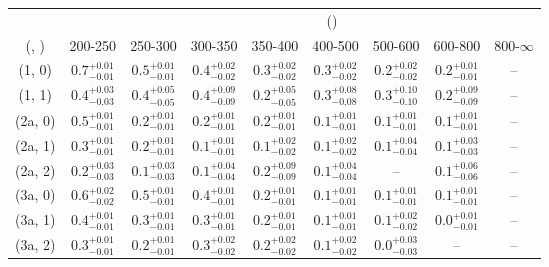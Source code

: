 \begin{table}[h!]
\tiny
\centering
{}
\begin{tabular}
{ccccccccc}
	\hline\hline
&	& \multicolumn{8}{c}{\scalht (\gev)} \\ 
	 (\njet,  \nb) & 200-250 & 250-300 & 300-350 & 350-400 & 400-500 & 500-600 & 600-800 & 800-$\infty$ \\ [0.8ex] 
\hline
	(1, 0) & $0.7^{+ 0.01 }_{- 0.01 }$ & $0.5^{+ 0.01 }_{- 0.01 }$ & $0.4^{+ 0.02 }_{- 0.02 }$ & $0.3^{+ 0.02 }_{- 0.02 }$ & $0.3^{+ 0.02 }_{- 0.02 }$ & $0.2^{+ 0.02 }_{- 0.02 }$ & $0.2^{+ 0.01 }_{- 0.01 }$ & -- \\[0.5ex] 
	(1, 1) & $0.4^{+ 0.03 }_{- 0.03 }$ & $0.4^{+ 0.05 }_{- 0.05 }$ & $0.4^{+ 0.09 }_{- 0.09 }$ & $0.2^{+ 0.05 }_{- 0.05 }$ & $0.3^{+ 0.08 }_{- 0.08 }$ & $0.3^{+ 0.10 }_{- 0.10 }$ & $0.2^{+ 0.09 }_{- 0.09 }$ & -- \\[0.5ex] 
	(2a, 0) & $0.5^{+ 0.01 }_{- 0.01 }$ & $0.2^{+ 0.01 }_{- 0.01 }$ & $0.2^{+ 0.01 }_{- 0.01 }$ & $0.2^{+ 0.01 }_{- 0.01 }$ & $0.1^{+ 0.01 }_{- 0.01 }$ & $0.1^{+ 0.01 }_{- 0.01 }$ & $0.1^{+ 0.01 }_{- 0.01 }$ & -- \\[0.5ex] 
	(2a, 1) & $0.3^{+ 0.01 }_{- 0.01 }$ & $0.2^{+ 0.01 }_{- 0.01 }$ & $0.1^{+ 0.01 }_{- 0.01 }$ & $0.1^{+ 0.02 }_{- 0.02 }$ & $0.1^{+ 0.02 }_{- 0.02 }$ & $0.1^{+ 0.04 }_{- 0.04 }$ & $0.1^{+ 0.03 }_{- 0.03 }$ & -- \\[0.5ex] 
	(2a, 2) & $0.2^{+ 0.03 }_{- 0.03 }$ & $0.1^{+ 0.03 }_{- 0.03 }$ & $0.1^{+ 0.04 }_{- 0.04 }$ & $0.2^{+ 0.09 }_{- 0.09 }$ & $0.1^{+ 0.04 }_{- 0.04 }$ & -- & $0.1^{+ 0.06 }_{- 0.06 }$ & -- \\[0.5ex] 
	(3a, 0) & $0.6^{+ 0.02 }_{- 0.02 }$ & $0.5^{+ 0.01 }_{- 0.01 }$ & $0.4^{+ 0.01 }_{- 0.01 }$ & $0.2^{+ 0.01 }_{- 0.01 }$ & $0.1^{+ 0.01 }_{- 0.01 }$ & $0.1^{+ 0.01 }_{- 0.01 }$ & $0.1^{+ 0.01 }_{- 0.01 }$ & -- \\[0.5ex] 
	(3a, 1) & $0.4^{+ 0.01 }_{- 0.01 }$ & $0.3^{+ 0.01 }_{- 0.01 }$ & $0.3^{+ 0.01 }_{- 0.01 }$ & $0.2^{+ 0.01 }_{- 0.01 }$ & $0.1^{+ 0.01 }_{- 0.01 }$ & $0.1^{+ 0.02 }_{- 0.02 }$ & $0.0^{+ 0.01 }_{- 0.01 }$ & -- \\[0.5ex] 
	(3a, 2) & $0.3^{+ 0.01 }_{- 0.01 }$ & $0.2^{+ 0.01 }_{- 0.01 }$ & $0.3^{+ 0.02 }_{- 0.02 }$ & $0.2^{+ 0.02 }_{- 0.02 }$ & $0.1^{+ 0.02 }_{- 0.02 }$ & $0.0^{+ 0.03 }_{- 0.03 }$ & -- & -- \\[0.5ex] 

\end{tabular}
\end{table}
